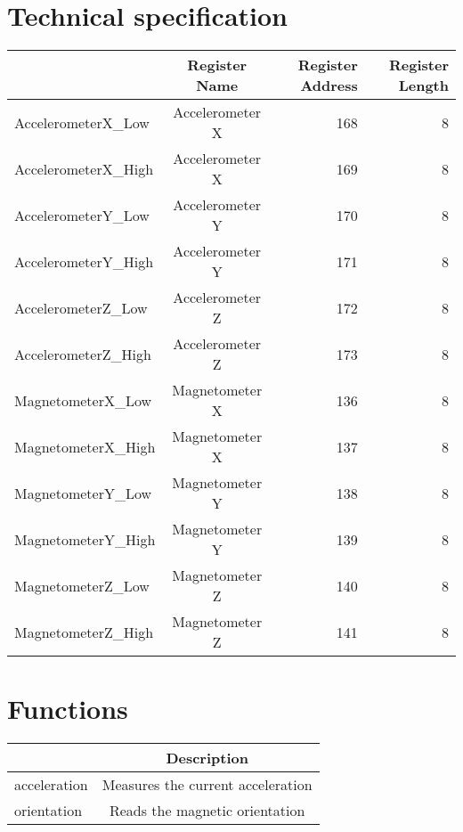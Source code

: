 \documentclass[a4paper,12pt,oneside,pdflatex,italian,final,twocolumn]{article}
\begin{document}
\section{Technical specification}
\centering
\begin{tabular}{lcrr}
\toprule
 & Register Name & Register Address & Register Length \\
\midrule
AccelerometerX_Low & Accelerometer X & 168 & 8 \\
AccelerometerX_High & Accelerometer X & 169 & 8 \\
AccelerometerY_Low & Accelerometer Y & 170 & 8 \\
AccelerometerY_High & Accelerometer Y & 171 & 8 \\
AccelerometerZ_Low & Accelerometer Z & 172 & 8 \\
AccelerometerZ_High & Accelerometer Z & 173 & 8 \\
MagnetometerX_Low & Magnetometer X & 136 & 8 \\
MagnetometerX_High & Magnetometer X & 137 & 8 \\
MagnetometerY_Low & Magnetometer Y & 138 & 8 \\
MagnetometerY_High & Magnetometer Y & 139 & 8 \\
MagnetometerZ_Low & Magnetometer Z & 140 & 8 \\
MagnetometerZ_High & Magnetometer Z & 141 & 8 \\
\bottomrule
\end{tabular}

\raggedright


\section{Functions}

\centering
\begin{tabular}{lc}
\toprule
  & Description \\
\midrule
acceleration & Measures the current acceleration \\
orientation & Reads the magnetic orientation \\
\bottomrule
\end{tabular}

\raggedright
\end{document}
